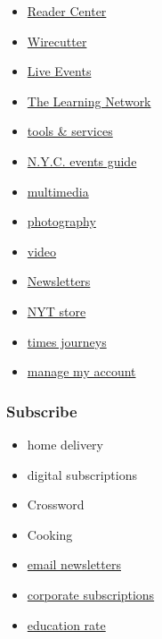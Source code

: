 \begin{itemize}
\tightlist
\item
  \href{https://www.nytimes.com/section/reader-center}{Reader Center}
\item
  \href{https://thewirecutter.com}{Wirecutter}
\item
  \href{http://nytconferences.com/}{Live Events}
\item
  \href{https://www.nytimes.com/section/learning}{The Learning Network}
\item
  \href{http://www.nytimes.com/marketing/tools-and-services}{tools \&
  services}
\item
  \href{https://www.nytimes.com/spotlight/arts-listings}{N.Y.C. events
  guide}
\item
  \href{https://www.nytimes.com/section/multimedia}{multimedia}
\item
  \href{https://www.nytimes.com/section/lens}{photography}
\item
  \href{https://www.nytimes.com/video}{video}
\item
  \href{https://www.nytimes.com/newsletters}{Newsletters}
\item
  \href{https://store.nytimes.com/}{NYT store}
\item
  \href{https://www.nytimes.com/times-journeys}{times journeys}
\item
  \href{https://account.nytimes.com/}{manage my account}
\end{itemize}

\hypertarget{subscribe}{%
\subsubsection{Subscribe}\label{subscribe}}

\begin{itemize}
\tightlist
\item
  home delivery
\item
  digital subscriptions
\item
  Crossword
\item
  Cooking
\end{itemize}

\begin{itemize}
\tightlist
\item
  \href{https://www.nytimes.com/newsletters}{email newsletters}
\item
  \href{https://www.nytimes.com/corporateleftnav}{corporate
  subscriptions}
\item
  \href{https://www.nytimes.com/educationleftnav}{education rate}
\end{itemize}

